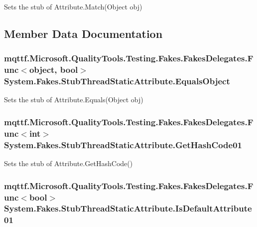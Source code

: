 Sets the stub of Attribute.\-Match(\-Object obj)



\subsection{Member Data Documentation}
\hypertarget{class_system_1_1_fakes_1_1_stub_thread_static_attribute_abe3c5ce6e5bad9bf92d47e97cd26497a}{
\subsubsection[{Equals\-Object}]{\setlength{\rightskip}{0pt plus 5cm}mqttf.\-Microsoft.\-Quality\-Tools.\-Testing.\-Fakes.\-Fakes\-Delegates.\-Func$<$object, bool$>$ System.\-Fakes.\-Stub\-Thread\-Static\-Attribute.\-Equals\-Object}}\label{class_system_1_1_fakes_1_1_stub_thread_static_attribute_abe3c5ce6e5bad9bf92d47e97cd26497a}


Sets the stub of Attribute.\-Equals(\-Object obj)

\hypertarget{class_system_1_1_fakes_1_1_stub_thread_static_attribute_a8d975d7ae761f02633f880e945c746f4}{
\subsubsection[{Get\-Hash\-Code01}]{\setlength{\rightskip}{0pt plus 5cm}mqttf.\-Microsoft.\-Quality\-Tools.\-Testing.\-Fakes.\-Fakes\-Delegates.\-Func$<$int$>$ System.\-Fakes.\-Stub\-Thread\-Static\-Attribute.\-Get\-Hash\-Code01}}\label{class_system_1_1_fakes_1_1_stub_thread_static_attribute_a8d975d7ae761f02633f880e945c746f4}


Sets the stub of Attribute.\-Get\-Hash\-Code()

\hypertarget{class_system_1_1_fakes_1_1_stub_thread_static_attribute_a9f2462e6a5145dba91e42337b1918b98}{
\subsubsection[{Is\-Default\-Attribute01}]{\setlength{\rightskip}{0pt plus 5cm}mqttf.\-Microsoft.\-Quality\-Tools.\-Testing.\-Fakes.\-Fakes\-Delegates.\-Func$<$bool$>$ System.\-Fakes.\-Stub\-Thread\-Static\-Attribute.\-Is\-Default\-Attribute01}}\label{class_system_1_1_fakes_1_1_stub_thread_static_attribute_a9f2462e6a5145dba91e42337b1918b98}


